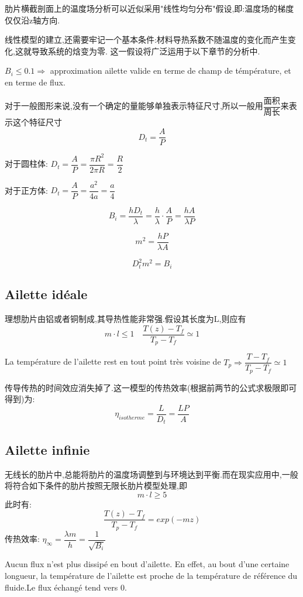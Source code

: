 \documentclass{article}
\begin{document}
肋片横截剖面上的温度场分析可以近似采用"线性均匀分布"假设,即:温度场的梯度仅仅沿z轴方向.

线性模型的建立,还需要牢记一个基本条件:材料导热系数不随温度的变化而产生变化,这就导致系统的焓变为零.
这一假设将广泛运用于以下章节的分析中.

$B_i \leq 0.1 \Rightarrow$ approximation ailette valide en terme de champ de t\'emp\'erature, et en terme de flux.

对于一般图形来说,没有一个确定的量能够单独表示特征尺寸,所以一般用$\dfrac{\text{面积}}{\text{周长}}$来表示这个特征尺寸\\

$$D_t = \frac{A}{P}$$

对于圆柱体: $D_t = \dfrac{A}{P} = \dfrac{\pi R^2}{2 \pi R} = \dfrac{R}{2}$

对于正方体: $D_t = \dfrac{A}{P} = \dfrac{a^2}{4a} = \dfrac{a}{4}$

$$ B_i = \frac{h D_t}{\lambda} = \frac{h}{\lambda} \cdot \frac{A}{P} = \frac{hA}{\lambda P}$$

$$ m^2 = \frac{hP}{\lambda A}$$

$$ D_t^2 m^2 = B_i$$

\subsection{Ailette id\'eale}
理想肋片由铝或者铜制成,其导热性能非常强.假设其长度为L,则应有
$$ m\cdot l \leq 1 \quad \frac{T(z)-T_f}{T_p - T_f} \simeq 1 $$

La temp\'erature de l'ailette rest en tout point tr\`es voisine de $T_p  \Rightarrow \dfrac{ T - T_f}{T_p - T_f}\simeq 1$

传导传热的时间效应消失掉了.这一模型的传热效率(根据前两节的公式求极限即可得到)为:
$$
\eta_{isotherme} = \dfrac{L}{D_t} = \dfrac{LP}{A}
$$

\subsection{Ailette infinie}
无线长的肋片中,总能将肋片的温度场调整到与环境达到平衡.而在现实应用中,一般将符合如下条件的肋片按照无限长肋片模型处理,即
$$ m\cdot l \geq 5 $$
此时有:
$$ \frac{T(z)-T_f}{T_p - T_f}=exp(-mz) $$
传热效率: $\eta_{\infty} = \dfrac{\lambda m}{h} = \dfrac{1}{\sqrt{B_i}}$

Aucun flux n'est plus dissip\'e en bout d'ailette. En effet, au bout d'une certaine longueur, la temp\'erature de l'ailette est proche de la temp\'erature de r\'ef\'erence du fluide.Le flux \'echang\'e tend vers $0$.
\end{document}
